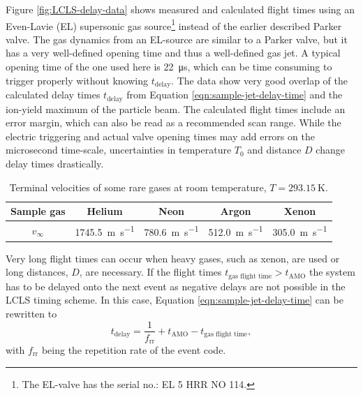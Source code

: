 Figure \ref{fig:LCLS-delay-data} shows measured and calculated flight times using an Even-Lavie (EL) supersonic gas source\footnote{The EL-valve has the serial no.: EL 5 HRR NO 114.} instead of the earlier described Parker valve. The gas dynamics from an EL-source are similar to a Parker valve, but it has a very well-defined opening time and thus a well-defined gas jet. A typical opening time of the one used here is \SI{22}{\micro\second}, which can be time consuming to trigger properly without knowing $t_{\text{delay}}$. The data show very good overlap of the calculated delay times $t_{\text{delay}}$ from Equation \ref{eqn:sample-jet-delay-time} and the ion-yield maximum of the particle beam. The calculated flight times include an error margin, which can also be read as a recommended scan range. While the electric triggering and actual valve opening times may add errors on the microsecond time-scale, uncertainties in temperature $T_{0}$ and distance $D$ change delay times drastically.\\[1\baselineskip]
%
\begin{table}
\centering
\begin{tabular}{ | c | c | c | c | c | }
\hline
	\textbf{Sample gas} & \textbf{Helium} & \textbf{Neon} & \textbf{Argon} & \textbf{Xenon} \\ \hline
	$v_{\infty}$ & \SI{1745.5}{\meter\per\second} & \SI{780.6}{\meter\per\second} & \SI{512.0}{\meter\per\second} & \SI{305.0}{\meter\per\second} \\ \hline
\end{tabular}
\caption{Terminal velocities of some rare gases at room temperature, $T=\SI{293.15}{\kelvin}$.}
\label{tab:terminal-velocities}
\end{table}
%
Very long flight times can occur when heavy gases, such as xenon, are used or long distances, $D$, are necessary. If the flight times $t_{\text{gas flight time}} > t_{\text{AMO}}$ the system has to be delayed onto the next event as negative delays are not possible in the LCLS timing scheme. In this case, Equation \eqref{eqn:sample-jet-delay-time} can be rewritten to
\begin{equation}
t_{\text{delay}} = \frac{1}{f_{\text{rr}}} + t_{\text{AMO}} - t_{\text{gas flight time}},
\label{eqn:sample-jet-delay-time-next}
\end{equation}
with $f_{\text{rr}}$ being the repetition rate of the event code.
%
%
%
